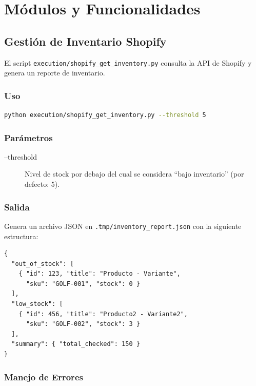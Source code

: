 \documentclass[a4paper,12pt]{article}
\begin{document}
\section{Módulos y Funcionalidades}

\subsection{Gestión de Inventario Shopify}

El script \texttt{execution/shopify\_get\_inventory.py} consulta la API de Shopify y genera un reporte de inventario.

\subsubsection{Uso}

\begin{lstlisting}[language=bash]
python execution/shopify_get_inventory.py --threshold 5
\end{lstlisting}

\subsubsection{Parámetros}

\begin{description}
    \item[--threshold] Nivel de stock por debajo del cual se considera ``bajo inventario'' (por defecto: 5).
\end{description}

\subsubsection{Salida}

Genera un archivo JSON en \texttt{.tmp/inventory\_report.json} con la siguiente estructura:

\begin{lstlisting}
{
  "out_of_stock": [
    { "id": 123, "title": "Producto - Variante",
      "sku": "GOLF-001", "stock": 0 }
  ],
  "low_stock": [
    { "id": 456, "title": "Producto2 - Variante2",
      "sku": "GOLF-002", "stock": 3 }
  ],
  "summary": { "total_checked": 150 }
}
\end{lstlisting}

\subsubsection{Manejo de Errores}
\end{document}
